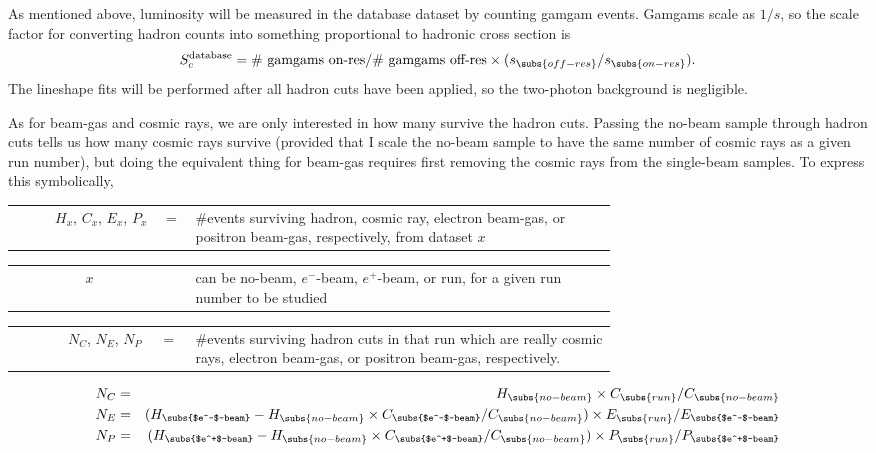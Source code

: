 As mentioned above, luminosity will be measured in the database
dataset by counting gamgam events.  Gamgams scale as $1/s$, so the
scale factor for converting hadron counts into something proportional
to hadronic cross section is
\begin{equation}
  S_c^{\mbox{\scriptsize database}} = \mbox{\# gamgams on-res} /
  \mbox{\# gamgams off-res} \times (s_\subs{off-res} /
  s_\subs{on-res})\mbox{.}
\end{equation}
The lineshape fits will be performed after all hadron cuts have been
applied, so the two-photon background is negligible.

As for beam-gas and cosmic rays, we are only interested in how many
survive the hadron cuts.  Passing the no-beam sample through hadron
cuts tells us how many cosmic rays survive (provided that I scale the
no-beam sample to have the same number of cosmic rays as a given run
number), but doing the equivalent thing for beam-gas requires first
removing the cosmic rays from the single-beam samples.  To express
this symbolically,
\begin{flushright}
  \begin{tabular}{r c p{0.7\linewidth}}
    $H_x$, $C_x$, $E_x$, $P_x$ &=& \#events surviving hadron, cosmic
    ray, electron beam-gas, or positron beam-gas, respectively, from
    dataset $x$ \\
  \end{tabular}
  \begin{tabular}{r c p{0.7\linewidth}}
    $x$ &\mbox{ }& can be no-beam, $e^-$-beam, $e^+$-beam, or run, for a
    given run number to be studied \\
  \end{tabular}
  \begin{tabular}{r c p{0.7\linewidth}}
    $N_C$, $N_E$, $N_P$ &=& \#events surviving hadron cuts in
    that run which are really cosmic rays, electron beam-gas, or
    positron beam-gas, respectively.
  \end{tabular}
\end{flushright}
\begin{eqnarray}
  N_C &=& H_\subs{no-beam} \times C_\subs{run} / C_\subs{no-beam}
  \label{datasets_N_C} \\
  N_E &=& (H_\subs{$e^-$-beam} - H_\subs{no-beam} \times
  C_\subs{$e^-$-beam} / C_\subs{no-beam}) \times E_\subs{run} /
  E_\subs{$e^-$-beam} \label{datasets_N_E} \\
  N_P &=& (H_\subs{$e^+$-beam} - H_\subs{no-beam} \times
  C_\subs{$e^+$-beam} / C_\subs{no-beam}) \times P_\subs{run} /
  P_\subs{$e^+$-beam} \label{datasets_N_P}
\end{eqnarray}

